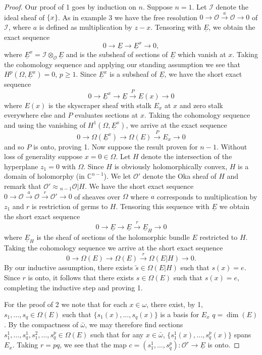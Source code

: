 \begin{proof}
Our proof of 1 goes by induction on $n$. Suppose $n=1$. Let $\mathcal{I}$ denote the ideal sheaf of $\{x\}$. As in example 3 we have the free resolution $0\to\mathcal{O}\xrightarrow{a}\mathcal{O}\to0$ of $\mathcal{I}$, where $a$ is defined as multiplication by $z-x$. Tensoring with $\underline E$, we obtain the exact sequence
\[
0\to\underline E\to\underline E^x\to0,
\]
where $\underline E^x=\mathcal{I}\otimes_{\mathcal{O}}\underline E$ and is the subsheaf of sections of $\underline E$ which vanish at $x$. Taking the cohomology sequence and applying our standing assumption we see that $H^p(\Omega,\underline E^x)=0$, $p\geq1$. Since $\underline E^x$ is a subsheaf of $\underline E$, we have the short exact sequence
\[
0\to\underline E^x\to\underline E\xrightarrow{P}E(x)\to0
\]
where $E(x)$ is the skyscraper sheaf with stalk $E_x$ at $x$ and zero stalk everywhere else and $P$ evaluates sections at $x$. Taking the cohomology sequence and using the vanishing of $H^1(\Omega,\underline E^x)$, we arrive at the exact sequence
\[
0\to\Omega(\underline E^x)\to\Omega(E)\xrightarrow{P}E_x\to0
\]
and so $P$ is onto, proving 1. Now suppose the result proven for $n-1$. Without loss of generality suppose $x=0\in\Omega$. Let $H$ denote the intersection of the hyperplane $z_1=0$ with $\Omega$. Since $H$ is obviously holomorphically convex, $H$ is a domain of holomorphy (in $\mathbb{C}^{n-1}$). We let $\mathcal{O}'$ denote the Oka sheaf of $H$ and remark that $\mathcal{O}'\approx{}_{n-1}\mathcal{O}|H$. We have the short exact sequence $0\to\mathcal{O}\xrightarrow{a}\mathcal{O}\xrightarrow{r}\mathcal{O}'\to0$ of sheaves over $\Omega$ where $a$ corresponds to multiplication by $z_1$ and $r$ is restriction of germs to $H$. Tensoring this sequence with $\underline E$ we obtain the short exact sequence
\[
0\to\underline E\to\underline E\xrightarrow{r}\underline E_H\to0
\]
where $\underline E_H$ is the sheaf of sections of the holomorphic bundle $E$ restricted to $H$. Taking the cohomology sequence we arrive at the short exact sequence
\[
0\to\Omega(E)\to\Omega(E)\xrightarrow{r}\Omega(E|H)\to0.
\]
By our inductive assumption, there exists $\widetilde s\in\Omega(E|H)$ such that $s(x)=e$. Since $r$ is onto, it follows that there exists $s\in\Omega(E)$ such that $s(x)=e$, completing the inductive step and proving 1.

For the proof of 2 we note that for each $x\in\omega$, there exist, by 1, $s_1,\ldots,s_q\in\Omega(E)$ such that $\{s_1(x),\ldots,s_q(x)\}$ is a basis for $E_x$
$q=\dim(E)$. By the compactness of $\bar\omega$, we may therefore find sections $s_1^1,\ldots,s_q^1,s_1^2,\ldots,s_q^p\in\Omega(E)$ such that for any $x\in\bar\omega$, $\{s_1^1(x),\ldots,s_q^p(x)\}$ spans $E_x$. Taking $r=pq$, we see that the map $c=(s_1^1,\ldots,s_q^p):\mathcal{O}^r\to\underline E$ is onto.
\end{proof}
